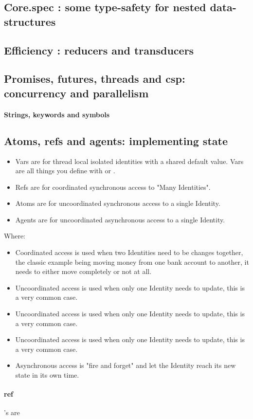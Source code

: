 \subsection{Core.spec : some type-safety for nested data-structures}


\subsection{Efficiency : reducers and transducers}


\subsection{Promises, futures, threads and csp: concurrency and parallelism}

\paragraph{Strings, keywords and symbols}


\subsection{Atoms, refs and agents: implementing state}



\begin{itemize}
    \item Vars are for thread local isolated identities with a shared default value. Vars are all things you define with  or .
    \item Refs are for coordinated synchronous access to "Many Identities".
    \item Atoms are for uncoordinated synchronous access to a single Identity.
    \item Agents are for uncoordinated asynchronous access to a single Identity.
\end{itemize}

Where: 

\begin{itemize}
    \item Coordinated access is used when two Identities need to be changes together, the classic example being moving money from one bank account to another, it needs to either move completely or not at all.
    \item Uncoordinated access is used when only one Identity needs to update, this is a very common case.
    \item Uncoordinated access is used when only one Identity needs to update, this is a very common case.
    \item Uncoordinated access is used when only one Identity needs to update, this is a very common case.
    \item Asynchronous access is "fire and forget" and let the Identity reach its new state in its own time.
\end{itemize}


\paragraph{ref}'s are 



